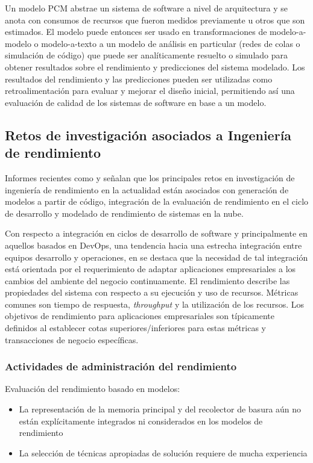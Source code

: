 \documentclass[11pt, twoside]{report}
\begin{document}
Un modelo PCM abstrae un sistema de software a nivel de arquitectura y se anota con consumos de recursos que fueron medidos previamente u otros que son estimados. El modelo puede entonces ser usado en transformaciones de modelo-a-modelo o modelo-a-texto a un modelo de análisis en particular (redes de colas o simulación de código) que puede ser analíticamente resuelto o simulado para obtener resultados sobre el rendimiento y predicciones del sistema modelado. Los resultados del rendimiento y las predicciones pueden ser utilizadas como retroalimentación para evaluar y mejorar el diseño inicial, permitiendo así una evaluación de calidad de los sistemas de software en base a un modelo\cite{noorshams}. 

\subsection{Retos de investigación asociados a Ingeniería de rendimiento}
Informes recientes como \cite{microservices-challenges} y \cite{performance-devops} señalan que los principales retos en investigación de ingeniería de rendimiento en la actualidad están asociados con generación de modelos a partir de código, integración de la evaluación de rendimiento en el ciclo de desarrollo y modelado de rendimiento de sistemas en la nube.

Con respecto a integración en ciclos de desarrollo de software y principalmente en aquellos basados en DevOps, una tendencia hacia una estrecha integración entre equipos desarrollo y operaciones, en \cite{performance-devops} se destaca que la necesidad de tal integración está orientada por el requerimiento de adaptar aplicaciones empresariales a los cambios del ambiente del negocio continuamente. El rendimiento describe las propiedades del sistema con respecto a su ejecución y uso de recursos. Métricas comunes son tiempo de respuesta, \emph{throughput} y la utilización de los recursos. Los objetivos de rendimiento para aplicaciones empresariales son típicamente definidos al establecer cotas superiores/inferiores para estas métricas y transacciones de negocio específicas. 

\subsubsection{Actividades de administración del rendimiento}
Evaluación del rendimiento basado en modelos:
\begin{itemize}
    \item La representación de la memoria principal y del recolector de basura aún no están explícitamente integrados ni considerados en los modelos de rendimiento
    \item La selección de técnicas apropiadas de solución requiere de mucha experiencia
\end{itemize}
\end{document}
